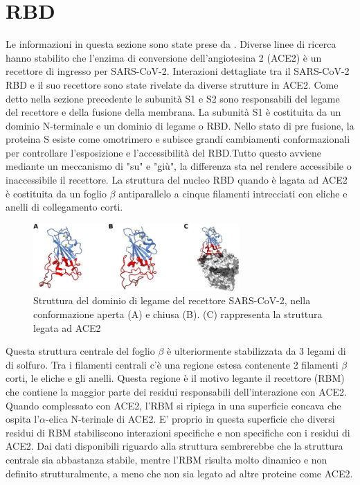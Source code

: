 \section{RBD}\label{sec:cap_sec_subsec}
Le informazioni in questa sezione sono state prese da \cite{RBDSpike}.
Diverse linee di ricerca hanno stabilito che l'enzima di conversione dell'angiotesina 2 (ACE2) è un recettore di ingresso per SARS-CoV-2. Interazioni dettagliate tra il SARS-CoV-2 RBD e il suo recettore sono state rivelate da diverse strutture in ACE2. Come detto nella sezione precedente le subunità S1 e S2 sono responsabili del legame del recettore e della fusione della membrana. La subunità S1 è costituita da un dominio N-terminale e un dominio di legame o RBD. Nello stato di pre fusione, la proteina S esiste come omotrimero e subisce grandi cambiamenti conformazionali per controllare l'esposizione e l'accessibilità del RBD.Tutto questo avviene mediante un meccanismo di "su" e "giù", la differenza sta nel rendere accessibile o inaccessibile il recettore. La struttura del nucleo RBD quando è lagata ad ACE2 è costituita da un foglio $\beta$ antiparallelo a cinque filamenti intrecciati con eliche e anelli di collegamento corti. 
\begin{figure}
	\centering
	\includegraphics[width=0.7\textwidth]{Immagini/RBD_structure.png}
	\caption{Struttura del dominio di legame del recettore SARS-CoV-2, nella conformazione aperta (A) e chiusa (B). (C) rappresenta la struttura legata ad ACE2}
	\label{fig:RBDstructure}
\end{figure}

Questa struttura centrale del foglio $\beta$ è ulteriormente stabilizzata da 3 legami di di solfuro. Tra i filamenti centrali c'è una regione estesa contenente 2 filamenti $\beta$ corti, le eliche e gli anelli. Questa regione è il motivo legante il recettore (RBM) che contiene la maggior parte dei residui responsabili dell'interazione con ACE2. Quando complessato con ACE2, l'RBM si ripiega in una superficie concava che ospita l'$\alpha$-elica N-terinale di ACE2. E' proprio in questa superficie che diversi residui di RBM stabiliscono interazioni specifiche e non specifiche con i residui di ACE2. Dai dati disponibili riguardo alla struttura sembrerebbe che la struttura centrale sia abbastanza stabile, mentre l'RBM risulta molto dinamico e non definito strutturalmente, a meno che non sia legato ad altre proteine come ACE2. 

